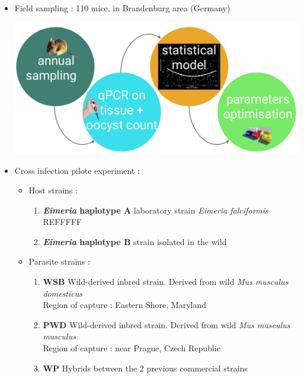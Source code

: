 \documentclass[30pt, a0paper, portrait, margin=0mm, innermargin=15mm,
               blockverticalspace=15mm, colspace=15mm, subcolspace=8mm]{tikzposter}
\begin{document}
\begin{columns}
      {
      
      \begin{itemize}
\item  Field sampling : 110 mice, in Brandenburg area (Germany)
      
      \begin{center}
          \includegraphics[scale=0.7]{matetmet.png} %
        \end{center}
        

\item Cross infection pilote experiment :

\begin{itemize}
\item Host strains :
\begin{enumerate}
\item \textbf{\textit{Eimeria} haplotype A} laboratory strain \textit{Eimeria falciformis} REFFFFF
\item \textbf{\textit{Eimeria} haplotype B} strain isolated in the wild 
\end{enumerate}

\item Parasite strains :
\begin{enumerate}
\item \textbf{WSB} Wild-derived inbred strain. Derived from wild \textit{Mus musculus domesticus}\\ Region of capture : Eastern Shore, Maryland
\item \textbf{PWD} Wild-derived inbred strain. Derived from wild \textit{Mus musculus musculus}\\ Region of capture : near Prague, Czech Republic
\item \textbf{WP} Hybrids between the 2 previous commercial strains
\end{enumerate}
\end{itemize}
\end{itemize}
}



\end{columns}
\end{document}

